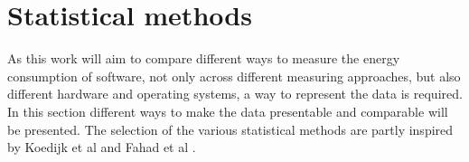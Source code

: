 \section{Statistical methods}\label{sec:stat}

As this work will aim to compare different ways to measure the energy consumption of software, not only across different measuring approaches, but also different hardware and operating systems, a way to represent the data is required. In this section different ways to make the data presentable and comparable will be presented. The selection of the various statistical methods are partly inspired by Koedijk et al\cite{Koedijk2022diff} and Fahad et al \cite{fahad2019comparative}.



